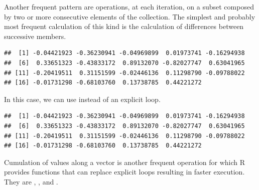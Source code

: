 \documentclass[krantz2]{krantz}\usepackage{knitr}%
\begin{document}
\begin{explainbox}
Another frequent pattern are operations, at each iteration, on a subset composed by two or more consecutive elements of the collection. The simplest and probably most frequent calculation of this kind is the calculation of differences between successive members.
\begin{knitrout}\footnotesize
{}\color{fgcolor}\begin{kframe}
\begin{alltt}
\hlstd{(}\hlstd{)}
 \hlkwb{<-} \hlstd{(}\hlstd{)}
 \hlkwb{<-} \hlstd{(} \hlopt{-} \hlstd{)}
   \hlstd{(} 
   \hlkwb{<-} \hlstd{a.vector[i} \hlopt{+} \hlstd{]} \hlopt{-} 
  \hlstd{\}}
\end{alltt}
\begin{verbatim}
##  [1] -0.04421923 -0.36230941 -0.04969899  0.01973741 -0.16294938
##  [6]  0.33651323 -0.43833172  0.89132070 -0.82027747  0.63041965
## [11] -0.20419511  0.31151599 -0.02446136  0.11298790 -0.09788022
## [16] -0.01731298 -0.68103760  0.13738785  0.44221272
\end{verbatim}
\end{kframe}
\end{knitrout}

In this case, we can use  instead of an explicit loop.
\begin{knitrout}\footnotesize
{}\color{fgcolor}\begin{kframe}
\begin{alltt}
 \hlkwb{<-} 
\end{alltt}
\begin{verbatim}
##  [1] -0.04421923 -0.36230941 -0.04969899  0.01973741 -0.16294938
##  [6]  0.33651323 -0.43833172  0.89132070 -0.82027747  0.63041965
## [11] -0.20419511  0.31151599 -0.02446136  0.11298790 -0.09788022
## [16] -0.01731298 -0.68103760  0.13738785  0.44221272
\end{verbatim}
\end{kframe}
\end{knitrout}

Cumulation of values along a vector is another frequent operation for which R provides functions that can replace explicit  loops resulting in faster execution. They are , ,  and .

\end{explainbox}
\end{document}
